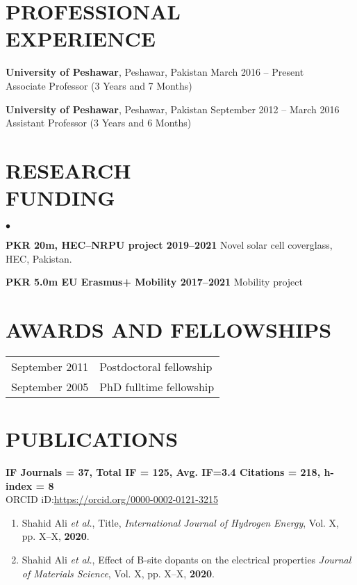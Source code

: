 \documentclass[margin,line]{res}
\newenvironment{list2}{
  \begin{list}{$\bullet$}{%
      \setlength{\itemsep}{0in}
      \setlength{\parsep}{0in} \setlength{\parskip}{0in}
      \setlength{\topsep}{0in} \setlength{\partopsep}{0in}
      \setlength{\leftmargin}{0.2in}}}{\end{list}}
\begin{document}
\begin{resume}
\section{PROFESSIONAL\\EXPERIENCE}
{\bf University of Peshawar}, Peshawar, Pakistan \hfill March 2016 -- Present\\
Associate Professor \hfill(3 Years and 7 Months)

{\bf University of Peshawar}, Peshawar, Pakistan \hfill September 2012 -- 
March 2016\\
Assistant Professor \hfill(3 Years and 6 Months)

\section{RESEARCH\\FUNDING}
\begin{list2}
\item {\bf PKR 20m, HEC--NRPU project 2019--2021} Novel solar cell 
coverglass, HEC, Pakistan.
\item {\bf PKR 5.0m EU Erasmus+ Mobility 2017--2021} Mobility project 
\end{list2}

\section{AWARDS AND FELLOWSHIPS}
\vspace{.05in}
\begin{tabular}{@{}p{1.3in}p{4.4in}}

September 2011 & {Postdoctoral fellowship}\\
September 2005 & {PhD fulltime fellowship} \\ 
\end{tabular}
\section{PUBLICATIONS} 
{\bf IF Journals = 37,	Total IF = 125,  Avg. IF=3.4		Citations = 
218,     
h-index = 8}\\{ORCID iD:}\url{https://orcid.org/0000-0002-0121-3215}
\begin{enumerate}
\item Shahid Ali \textit{et al.}, Title, \textit{International Journal of 
Hydrogen Energy}, Vol. X, pp. X--X, \textbf{2020}.
\item Shahid Ali \textit{et al.}, Effect of B-site dopants on the electrical 
properties \textit{Journal of Materials Science}, Vol. X, pp. X--X, 
\textbf{2020}.
\end{enumerate}


\end{resume}
\end{document}
